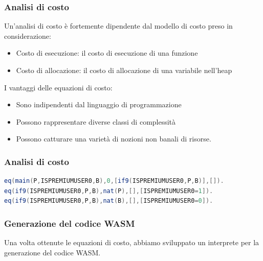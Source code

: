 \documentclass[xcolor=dvipsnames]{beamer}
\begin{document}
\begin{frame}
    \frametitle{Analisi di costo}
    Un'analisi di costo è fortemente dipendente dal modello di costo preso in considerazione:
    \begin{itemize}
        \item \alert{Costo di esecuzione}: il costo di esecuzione di una funzione
        \item \alert{Costo di allocazione}: il costo di allocazione di una variabile nell'heap
    \end{itemize}
    I vantaggi delle equazioni di costo:
    \begin{itemize}
        \item Sono \alert{indipendenti} dal linguaggio di programmazione
        \item Possono rappresentare diverse classi di \alert{complessità}
        \item Possono catturare una varietà di nozioni non banali di risorse.
    \end{itemize}
\end{frame}
\begin{frame}[fragile]
    \frametitle{Analisi di costo}
\begin{lstlisting}[language=Java, caption={Equazioni di costo per Listing 8}]
eq(main(P,ISPREMIUMUSER0,B),0,[if9(ISPREMIUMUSER0,P,B)],[]).
eq(if9(ISPREMIUMUSER0,P,B),nat(P),[],[ISPREMIUMUSER0=1]).
eq(if9(ISPREMIUMUSER0,P,B),nat(B),[],[ISPREMIUMUSER0=0]).
\end{lstlisting}
\end{frame}
\begin{frame}
    \frametitle{Generazione del codice WASM}
    Una volta ottenute le equazioni di costo, abbiamo sviluppato un interprete per la generazione del codice WASM.
\end{frame}
\end{document}
